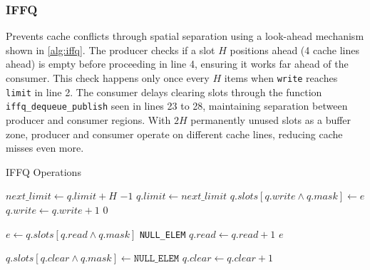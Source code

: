 \subsubsection{\acf{IFFQ}}
Prevents cache conflicts through spatial separation using a look-ahead mechanism shown in \cref{alg:iffq}. The producer checks if a slot $H$ positions ahead (4 cache lines ahead) is empty before proceeding in line 4, ensuring it works far ahead of the consumer. This check happens only once every $H$ items when \texttt{write} reaches \texttt{limit} in line 2. The consumer delays clearing slots through the function \texttt{iffq\_dequeue\_publish} seen in lines 23 to 28, maintaining separation between producer and consumer regions. With $2H$ permanently unused slots as a buffer zone, producer and consumer operate on different cache lines, reducing cache misses even more. \cite{MaffioneCacheAware}

\begin{algorithm}[!ht]
    \centering
    \captionsetup{justification=centering}
    \caption{\ac{IFFQ} Operations \cite{MaffioneCacheAware}}
    \label{alg:iffq}
    \scriptsize
    \begin{algorithmic}[1]
             
                \State $next\_limit \gets q.limit + H$
                    \State \Return $-1$ 
                \EndIf
                \State $q.limit \gets next\_limit$ 
            \EndIf
            \State $q.slots[q.write \land q.mask] \gets e$
            \State $q.write \gets q.write + 1$
            \State \Return $0$
        \EndFunction
        
        \State
        
            \State $e \gets q.slots[q.read \land q.mask]$
                \State \Return \texttt{NULL\_ELEM}
            \EndIf
            \State $q.read \gets q.read + 1$
            \State \Return $e$
        \EndFunction
        
        \State
        
                \State $q.slots[q.clear \land q.mask] \gets \texttt{NULL\_ELEM}$
                \State $q.clear \gets q.clear + 1$
            \EndWhile
        \EndFunction
    \end{algorithmic}
\end{algorithm}

